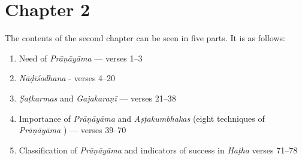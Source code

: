 \section*{Chapter 2}

The contents of the second chapter can be seen in five parts. It is as follows:  

\begin{enumerate}
\item Need  of \textit{Prāṇāyāma} ---  verses 1--3 
\item \textit{Nāḍīśodhana}  - verses 4--20
\item \textit{Ṣaṭkarmas} and \textit{Gajakaraṇī} --- verses 21--38
\item Importance of \textit{Prāṇāyāma} and \textit{Aṣṭakumbhakas} (eight techniques of \textit{Prāṇāyāma} ) --- verses 39--70
\item Classification of \textit{Prāṇāyāma} and indicators of  success in \textit{Haṭha} verses 71--78
\end{enumerate}

